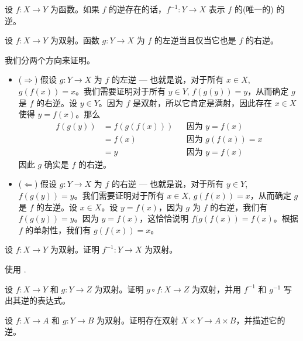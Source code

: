 \begin{notation}
设 $f : X \to Y$ 为函数。如果 $f$ 的逆存在的话，$f^{-1} : Y \to X$ 表示 $f$ 的(唯一的) 的逆。
\end{notation}

\begin{proposition}
设 $f : X \to Y$ 为双射。函数 $g : Y \to X$ 为 $f$ 的左逆当且仅当它也是 $f$ 的右逆。
\end{proposition}

\begin{cproof}
我们分两个方向来证明。
\begin{itemize}
\item ($\Rightarrow$) 假设 $g : Y \to X$ 为 $f$ 的左逆 --- 也就是说，对于所有 $x \in X$, $g(f(x))=x$。我们需要证明对于所有 $y \in Y$, $f(g(y))=y$，从而确定 $g$ 是 $f$ 的右逆。设 $y \in Y$。因为 $f$ 是双射，所以它肯定是满射，因此存在 $x \in X$ 使得 $y=f(x)$。那么
\begin{align*}
f(g(y)) &= f(g(f(x))) && \text{因为 $y=f(x)$} \\
&= f(x) && \text{因为 $g(f(x))=x$} \\
&= y && \text{因为 $y=f(x)$}
\end{align*}
因此 $g$ 确实是 $f$ 的右逆。
\item ($\Leftarrow$) 假设 $g : Y \to X$ 为 $f$ 的右逆 --- 也就是说，对于所有 $y \in Y$, $f(g(y))=y$。我们需要证明对于所有 $x \in X$, $g(f(x))=x$，从而确定 $g$ 是 $f$ 的左逆。设 $x \in X$。设 $y = f(x)$，因为 $g$ 为 $f$ 的右逆，我们有 $f(g(y)) = y$。因为 $y=f(x)$，这恰恰说明 $f(g(f(x)) = f(x)$。根据 $f$ 的单射性，我们有 $g(f(x))=x$。
\end{itemize}
\end{cproof}

\begin{exercise}
\label{exInverseBijection}
设 $f : X \to Y$ 为双射。证明 $f^{-1} : Y \to X$ 为双射。
\begin{backhint}
使用 .
\end{backhint}
\end{exercise}

\begin{exercise}
\label{exCompositeBijection}
设 $f : X \to Y$ 和 $g : Y \to Z$ 为双射。证明 $g \circ f : X \to Z$ 为双射，并用 $f^{-1}$ 和 $g^{-1}$ 写出其逆的表达式。
\end{exercise}

\begin{exercise}
设 $f : X \to A$ 和 $g : Y \to B$ 为双射。证明存在双射 $X \times Y \to A \times B$，并描述它的逆。
\end{exercise}

